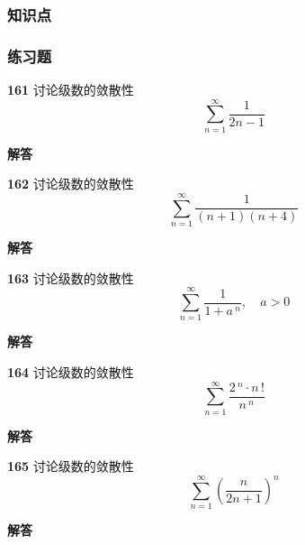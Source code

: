 \documentclass[a4paper,10pt]{article} %
\begin{document}
\subsubsection{知识点}
\subsubsection{练习题}
\par\noindent \textbf{161} \quad 讨论级数的敛散性
$$\sum_{n=1}^{\infty}\frac{1}{2n-1}$$
\par\noindent \textbf{ 解答}




\textheight


\par\noindent \textbf{162} \quad 讨论级数的敛散性
$$\sum_{n=1}^{\infty}\frac{1}{(n+1)(n+4)}$$
\par\noindent \textbf{ 解答}




\textheight


\par\noindent \textbf{163} \quad 讨论级数的敛散性
$$\sum_{n=1}^{\infty}\frac{1}{1+a\,^n}, \quad a>0$$
\par\noindent \textbf{ 解答}




\textheight


\par\noindent \textbf{164} \quad 讨论级数的敛散性
$$\sum_{n=1}^{\infty}\frac{2\,^n\cdot n\,!}{n\,^n}$$
\par\noindent \textbf{ 解答}




\textheight


\par\noindent \textbf{165} \quad 讨论级数的敛散性
$$\sum_{n=1}^{\infty}\left(\frac{n}{2n+1}\right)^n$$
\par\noindent \textbf{ 解答}
\end{document}
